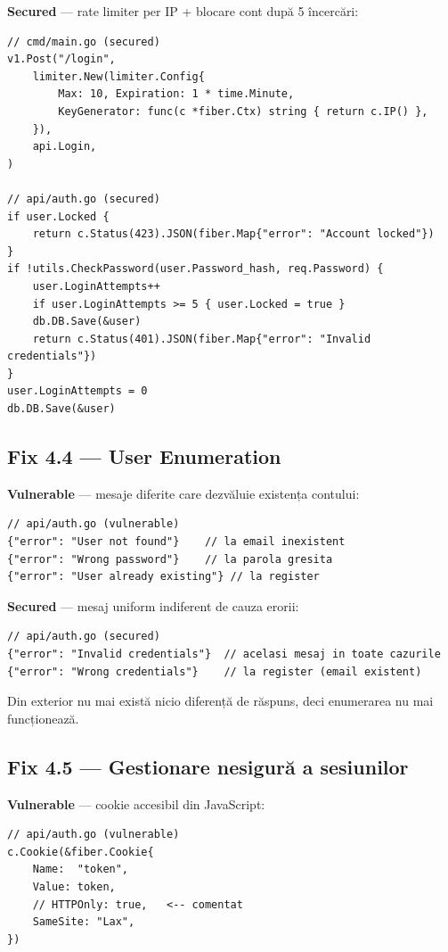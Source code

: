 \documentclass[12pt]{article}
\begin{document}
\textbf{Secured} --- rate limiter per IP + blocare cont după 5 încercări:
\begin{lstlisting}[language={}]
// cmd/main.go (secured)
v1.Post("/login",
    limiter.New(limiter.Config{
        Max: 10, Expiration: 1 * time.Minute,
        KeyGenerator: func(c *fiber.Ctx) string { return c.IP() },
    }),
    api.Login,
)

// api/auth.go (secured)
if user.Locked {
    return c.Status(423).JSON(fiber.Map{"error": "Account locked"})
}
if !utils.CheckPassword(user.Password_hash, req.Password) {
    user.LoginAttempts++
    if user.LoginAttempts >= 5 { user.Locked = true }
    db.DB.Save(&user)
    return c.Status(401).JSON(fiber.Map{"error": "Invalid credentials"})
}
user.LoginAttempts = 0
db.DB.Save(&user)
\end{lstlisting}

\subsection{Fix 4.4 --- User Enumeration}

\textbf{Vulnerable} --- mesaje diferite care dezvăluie existența contului:
\begin{lstlisting}[language={}]
// api/auth.go (vulnerable)
{"error": "User not found"}    // la email inexistent
{"error": "Wrong password"}    // la parola gresita
{"error": "User already existing"} // la register
\end{lstlisting}

\textbf{Secured} --- mesaj uniform indiferent de cauza erorii:
\begin{lstlisting}[language={}]
// api/auth.go (secured)
{"error": "Invalid credentials"}  // acelasi mesaj in toate cazurile
{"error": "Wrong credentials"}    // la register (email existent)
\end{lstlisting}

Din exterior nu mai există nicio diferență de răspuns, deci enumerarea nu mai funcționează.

\subsection{Fix 4.5 --- Gestionare nesigură a sesiunilor}

\textbf{Vulnerable} --- cookie accesibil din JavaScript:
\begin{lstlisting}[language={}]
// api/auth.go (vulnerable)
c.Cookie(&fiber.Cookie{
    Name:  "token",
    Value: token,
    // HTTPOnly: true,   <-- comentat
    SameSite: "Lax",
})
\end{lstlisting}
\end{document}
